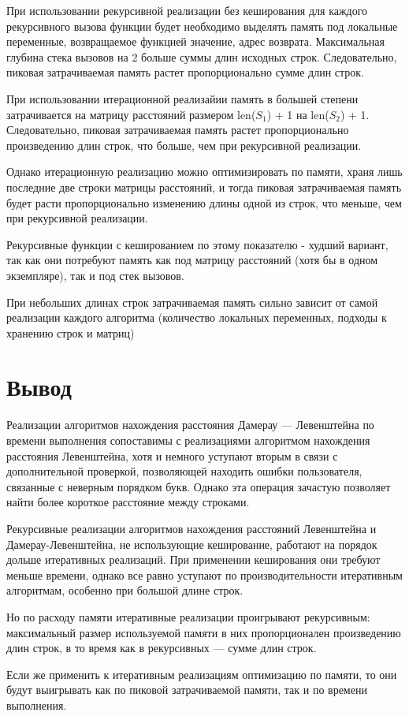 При использовании рекурсивной реализации без кеширования для каждого рекурсивного вызова функции будет необходимо выделять память под локальные переменные, возвращаемое функцией значение, адрес возврата. Максимальная глубина стека вызовов на 2 больше суммы длин исходных строк. Следовательно, пиковая затрачиваемая память растет пропорционально сумме длин строк. 

При использовании итерационной реализайии память в большей степени затрачивается на матрицу расстояний размером  len($S_{1}$) + 1 на len($S_{2}$) + 1. Следовательно, пиковая затрачиваемая память растет пропорционально произведению длин строк, что больше, чем при рекурсивной реализации.

Однако итерационную реализацию можно оптимизировать по памяти, храня лишь последние две строки матрицы расстояний, и тогда пиковая затрачиваемая память будет расти пропорционально изменению длины одной из строк, что меньше, чем при рекурсивной реализации.

Рекурсивные функции с кешированием по этому показателю - худший вариант, так как они потребуют память как под матрицу расстояний (хотя бы в одном экземпляре), так и под стек вызовов.

При небольших длинах строк затрачиваемая память сильно зависит от самой реализации каждого алгоритма (количество локальных переменных, подходы к хранению строк и матриц)
\newpage
\section*{Вывод}

Реализации алгоритмов нахождения расстояния Дамерау — Левенштейна по времени выполнения сопоставимы с реализациями алгоритмом нахождения расстояния Левенштейна, хотя и немного уступают вторым в связи с дополнительной проверкой, позволяющей находить ошибки пользователя, связанные с неверным порядком букв. Однако эта операция зачастую позволяет найти более короткое расстояние между строками.

Рекурсивные реализации алгоритмов нахождения расстояний Левенштейна и Дамерау-Левенштейна, не использующие кеширование, работают на порядок дольше итеративных реализаций. При применении кеширования они требуют меньше времени, однако все равно уступают по производительности итеративным алгоритмам, особенно при большой длине строк. 

Но по расходу памяти итеративные реализации проигрывают рекурсивным: максимальный размер используемой памяти в них пропорционален произведению длин строк, в то время как в рекурсивных — сумме длин строк.

Если же применить к итеративным реализациям оптимизацию по памяти, то они будут выигрывать как по пиковой затрачиваемой памяти, так и по времени выполнения.
